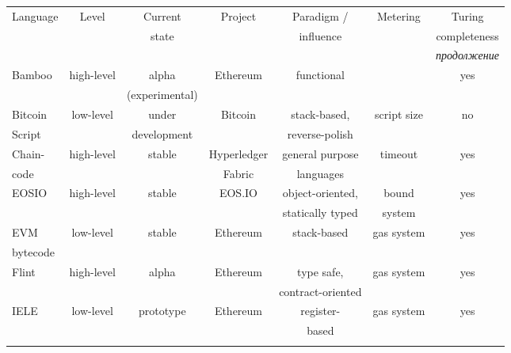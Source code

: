 \begin{ThreePartTable}
\renewcommand\TPTminimum{\textwidth}
\setlength\LTleft{0pt}
\setlength\LTright{0pt}
\setlength\tabcolsep{0pt}
\fontsize{11}{12}\selectfont
\begin{longtable}{  l @{\extracolsep{\fill}} *{6}{c} }
\toprule
    Language & Level & Current & Project
    & Paradigm /& Metering & Turing\\ 
    & & state & & influence & & completeness\\
\midrule
\endhead

\midrule[\heavyrulewidth]
\multicolumn{7}{r}{\textit{продолжение}}\\
\endfoot  

\midrule[\heavyrulewidth]
\endlastfoot

Bamboo & high-level & alpha & Ethereum & functional 
& \centering {gas system} & yes\\
& & (experimental) & & & &\\
\addlinespace

Bitcoin & low-level & under & Bitcoin & stack-based, 
& script size & no\\
Script & & development & & reverse-polish & &\\
\addlinespace

Chain-& high-level & stable & Hyperledger & general purpose & timeout & yes\\
code & & & Fabric & languages & &\\
\addlinespace

EOSIO & high-level& stable & {EOS.IO} & object-oriented, & bound & yes\\
& & & & statically typed & system &\\    
\addlinespace

EVM & low-level& stable & Ethereum & stack-based & \centering gas system & yes\\
bytecode & & & & & &\\
\addlinespace

Flint & high-level & alpha & Ethereum & type safe, & {\centering gas system} & yes\\
& & & & contract-oriented& &\\
\addlinespace

IELE & low-level & prototype & Ethereum & register- & gas system & yes\\
& & & & based & &\\
\addlinespace


\end{longtable}
\end{ThreePartTable}
